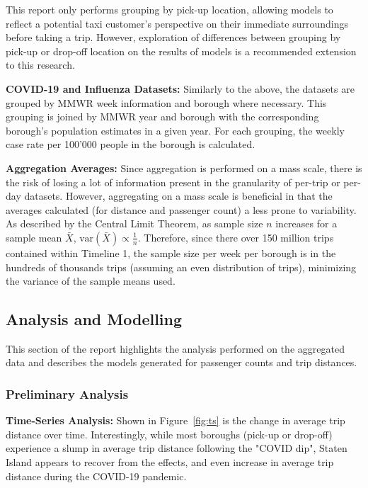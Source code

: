 \documentclass[11pt]{article}
\begin{document}
This report only performs grouping by pick-up location,
allowing models to reflect a potential taxi customer's perspective on their immediate surroundings before taking a trip.
However, exploration of differences between grouping by pick-up or drop-off location on the results of models 
is a recommended extension to this research.

\textbf{COVID-19 and Influenza Datasets:}
Similarly to the above, the datasets are grouped by MMWR week information and borough where necessary.
This grouping is joined by MMWR year and borough with the corresponding borough's population estimates in a given year.
For each grouping, the weekly case rate per 100'000 people in the borough is calculated.

\textbf{Aggregation Averages:}
Since aggregation is performed on a mass scale, there is the risk of losing a lot of information present in the granularity of per-trip or per-day datasets.
However, aggregating on a mass scale is beneficial in that the averages calculated (for distance and passenger count)
a less prone to variability. As described by the Central Limit Theorem, as sample size $n$ increases for a sample mean $\bar{X}$, 
$\text{var}(\bar{X}) \propto \frac{1}{n}$. Therefore, since there over 150 million trips contained within Timeline 1, the sample size per week per borough is in the hundreds of thousands trips (assuming an even distribution of trips),
minimizing the variance of the sample means used.

\pagebreak
\subsection{Analysis and Modelling}

This section of the report highlights the analysis performed on the aggregated data
and describes the models generated for passenger counts and trip distances.

\subsubsection{Preliminary Analysis}

\textbf{Time-Series Analysis:}
Shown in Figure~\ref{fig:ts} is the change in average trip distance over time. Interestingly, 
while most boroughs (pick-up or drop-off) experience a slump in average trip distance following the "COVID dip", 
Staten Island appears to recover from the effects, and even increase in average trip distance
during the COVID-19 pandemic.
\end{document}

